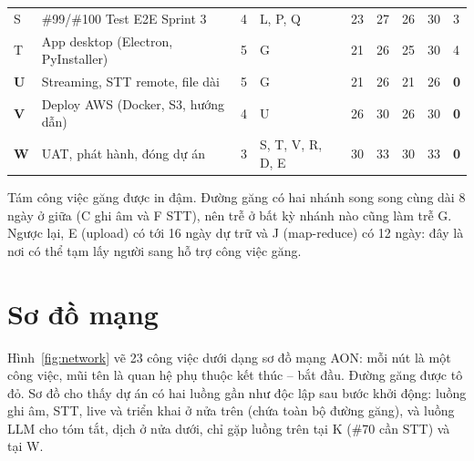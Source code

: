 \documentclass[12pt,a4paper]{report}
\begin{document}
\begin{table}[htbp]
\begin{tabularx}{\linewidth}{@{}Q{0.6cm}LQ{1.0cm}P{2.1cm}rrrrQ{1.2cm}@{}}
    S & \#99/\#100 Test E2E Sprint 3 & 4 & L, P, Q & 23 & 27 & 26 & 30 & 3 \\
    T & App desktop (Electron, PyInstaller) & 5 & G & 21 & 26 & 25 & 30 & 4 \\
    \textbf{U} & Streaming, STT remote, file dài & 5 & G & 21 & 26 & 21 & 26 & \textbf{0} \\
    \textbf{V} & Deploy AWS (Docker, S3, hướng dẫn) & 4 & U & 26 & 30 & 26 & 30 & \textbf{0} \\
    \textbf{W} & UAT, phát hành, đóng dự án & 3 & S, T, V, R, D, E & 30 & 33 & 30 & 33 & \textbf{0} \\
    \bottomrule
  \end{tabularx}
\end{table}

Tám công việc găng được in đậm. Đường găng có hai nhánh song song cùng dài 8 ngày ở giữa (C ghi âm và F STT), nên
trễ ở bất kỳ nhánh nào cũng làm trễ G. Ngược lại, E (upload) có tới 16 ngày dự trữ và J (map-reduce) có 12 ngày:
đây là nơi có thể tạm lấy người sang hỗ trợ công việc găng.

\section{Sơ đồ mạng}

Hình~\ref{fig:network} vẽ 23 công việc dưới dạng sơ đồ mạng AON: mỗi nút là một công việc, mũi tên là quan hệ
phụ thuộc kết thúc -- bắt đầu. Đường găng được tô đỏ. Sơ đồ cho thấy dự án có hai luồng gần như độc lập sau bước
khởi động: luồng ghi âm, STT, live và triển khai ở nửa trên (chứa toàn bộ đường găng), và luồng LLM cho tóm tắt,
dịch ở nửa dưới, chỉ gặp luồng trên tại K (\#70 cần STT) và tại W.
\end{document}
